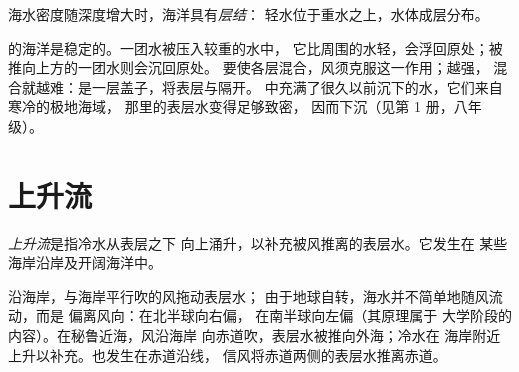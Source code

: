 \begin{definition}[层结]\label{def:g10:layered-ocean:stratification}
海水密度随深度增大时，海洋具有\emph{层结}：
轻水位于重水之上，水体成层分布。
\end{definition}

的海洋是稳定的。一团水被压入较重的水中，
它比周围的水轻，会浮回原处；被推向上方的一团水则会沉回原处。
要使各层混合，风须克服这一作用；越强，
混合就越难：是一层盖子，将表层与隔开。
中充满了很久以前沉下的水，它们来自寒冷的极地海域，
那里的表层水变得足够致密，
因而下沉（见第 1 册，八年级）。

\section{上升流}

\begin{definition}[上升流]\label{def:g10:layered-ocean:upwelling}
\emph{上升流}是指冷水从表层之下
向上涌升，以补充被风推离的表层水。它发生在
某些海岸沿岸及开阔海洋中。
\end{definition}

沿海岸，与海岸平行吹的风拖动表层水；
由于地球自转，海水并不简单地随风流动，而是
偏离风向：在北半球向右偏，
在南半球向左偏（其原理属于
大学阶段的内容）。在秘鲁近海，风沿海岸
向赤道吹，表层水被推向外海；冷水在
海岸附近上升以补充。也发生在赤道沿线，
信风将赤道两侧的表层水推离赤道。

